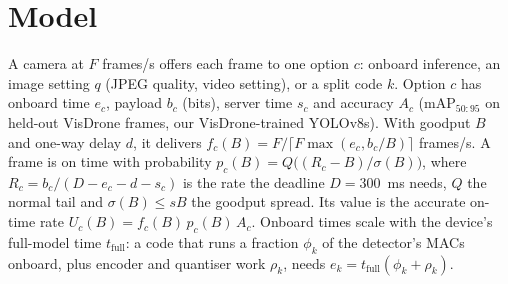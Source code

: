 \documentclass[conference,10pt]{IEEEtran}
\begin{document}
\section{Model}\label{sec:model}
A camera at $F$ frames/s offers each frame to one option $c$: onboard inference, an image setting $q$ (JPEG quality,
video setting), or a split code $k$. Option $c$ has onboard time $e_c$, payload $b_c$ (bits), server time $s_c$ and
accuracy $A_c$ (mAP$_{50:95}$ on held-out VisDrone frames, our VisDrone-trained YOLOv8s). With goodput $B$ and one-way
delay $d$, it delivers $f_c(B) = F/\lceil F\max(e_c, b_c/B)\rceil$ frames/s. A frame is on time with probability
$p_c(B) = Q\big((R_c - B)/\sigma(B)\big)$, where $R_c = b_c/(D - e_c - d - s_c)$ is the rate the deadline $D = 300$~ms
needs, $Q$ the normal tail and $\sigma(B) \le sB$ the goodput spread. Its value is the accurate on-time rate
$U_c(B) = f_c(B)\,p_c(B)\,A_c$. Onboard times scale with the device's full-model time $t_{\mathrm{full}}$: a code that
runs a fraction $\phi_k$ of the detector's MACs onboard, plus encoder and quantiser work $\rho_k$, needs
$e_k = t_{\mathrm{full}}(\phi_k + \rho_k)$.
\end{document}
